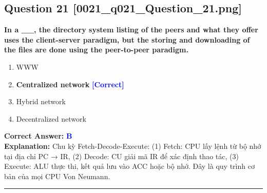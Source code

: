 \documentclass[11pt,a4paper]{article}
\begin{document}
\begin{minipage}{\textwidth}
\subsection*{Question 21 \quad \footnotesize{[0021\_q021\_Question\_21.png]}}
\noindent \textbf{In a \_\_, the directory system listing of the peers and what they offer uses the client-server paradigm, but the storing and downloading of the files are done using the peer-to-peer paradigm.}

\begin{enumerate}[label=\Alph*.]
    \item WWW
    \item \textbf{Centralized network} \hfill \textcolor{blue}{\textbf{[Correct]}}
    \item Hybrid network
    \item Decentralized network
\end{enumerate}

\noindent \textbf{Correct Answer:} \textcolor{blue}{\textbf{B}} \\[2pt]
\noindent \textbf{Explanation:} Chu kỳ Fetch-Decode-Execute: (1) Fetch: CPU lấy lệnh từ bộ nhớ tại địa chỉ PC → IR, (2) Decode: CU giải mã IR để xác định thao tác, (3) Execute: ALU thực thi, kết quả lưu vào ACC hoặc bộ nhớ. Đây là quy trình cơ bản của mọi CPU Von Neumann.

\par\vspace{0.3cm}
\hrule
\vspace{0.3cm}
\end{minipage}
\end{document}
